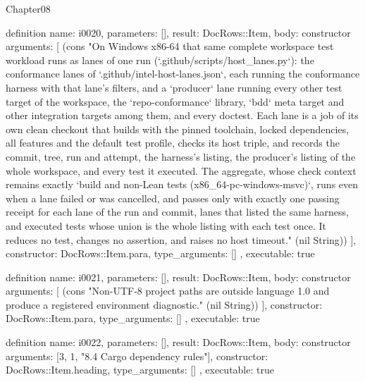 \begin{lexlean}{Chapter08}
\begin{semanticmodule}
definition{
  name: i0020,
  parameters: [],
  result: DocRows::Item,
  body: constructor{
    arguments: [
      (cons "On Windows x86-64 that same complete workspace test workload runs as lanes of one run (`.github/scripts/host_lanes.py`): the conformance lanes of `.github/intel-host-lanes.json`, each running the conformance harness with that lane's filters, and a `producer` lane running every other test target of the workspace, the `repo-conformance` library, `bdd` meta target and other integration targets among them, and every doctest. Each lane is a job of its own clean checkout that builds with the pinned toolchain, locked dependencies, all features and the default test profile, checks its host triple, and records the commit, tree, run and attempt, the harness's listing, the producer's listing of the whole workspace, and every test it executed. The aggregate, whose check context remains exactly `build and non-Lean tests (x86_64-pc-windows-msvc)`, runs even when a lane failed or was cancelled, and passes only with exactly one passing receipt for each lane of the run and commit, lanes that listed the same harness, and executed tests whose union is the whole listing with each test once. It reduces no test, changes no assertion, and raises no host timeout." (nil String))
    ],
    constructor: DocRows::Item.para,
    type_arguments: []
  },
  executable: true
}

definition{
  name: i0021,
  parameters: [],
  result: DocRows::Item,
  body: constructor{
    arguments: [
      (cons "Non-UTF-8 project paths are outside language 1.0 and produce a registered environment diagnostic." (nil String))
    ],
    constructor: DocRows::Item.para,
    type_arguments: []
  },
  executable: true
}

definition{
  name: i0022,
  parameters: [],
  result: DocRows::Item,
  body: constructor{
    arguments: [3, 1, "8.4 Cargo dependency rules"],
    constructor: DocRows::Item.heading,
    type_arguments: []
  },
  executable: true
}


\end{semanticmodule}
\end{lexlean}

